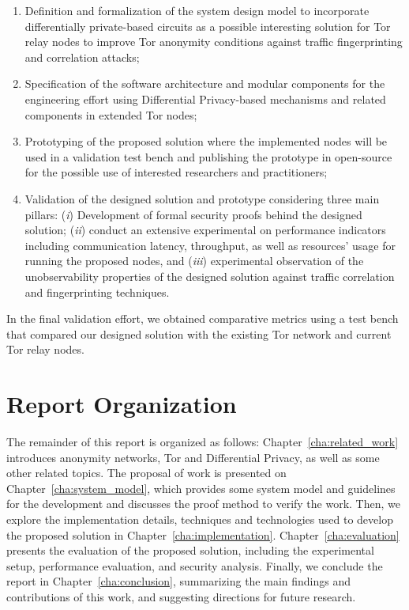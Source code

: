 \begin{enumerate}
    \item Definition and formalization of the system design model to incorporate differentially private-based circuits as a possible interesting solution for Tor relay nodes to improve Tor anonymity conditions against traffic fingerprinting and correlation attacks;

    \item Specification of the software architecture and modular components for the engineering effort using Differential Privacy-based mechanisms and related components in extended Tor nodes;
   
    \item Prototyping of the proposed solution where the implemented nodes will be used in a validation test bench and publishing the prototype in open-source for the possible use of interested researchers and practitioners;
   
    \item Validation of the designed solution and prototype considering three main pillars: (\emph{i}) Development of formal security proofs behind the designed solution; (\emph{ii}) conduct an extensive experimental on performance indicators including communication latency, throughput, as well as resources' usage for running the proposed nodes, and (\emph{iii}) experimental observation of the unobservability properties of the designed solution against traffic correlation and fingerprinting techniques. 
   
\end{enumerate}

In the final validation effort, we obtained comparative metrics using a test bench that compared our designed solution with the existing Tor network and current Tor relay nodes.


\section{Report Organization}\label{sec:report_organization}
The remainder of this report is organized as follows: Chapter~\ref{cha:related_work} introduces anonymity networks, Tor and Differential Privacy, as well as some other related topics. The proposal of work is presented on Chapter~\ref{cha:system_model}, which provides some system model and guidelines for the development and discusses the proof method to verify the work. Then, we explore the implementation details, techniques and technologies used to develop the proposed solution in Chapter~\ref{cha:implementation}. Chapter~\ref{cha:evaluation} presents the evaluation of the proposed solution, including the experimental setup, performance evaluation, and security analysis. Finally, we conclude the report in Chapter~\ref{cha:conclusion}, summarizing the main findings and contributions of this work, and suggesting directions for future research.